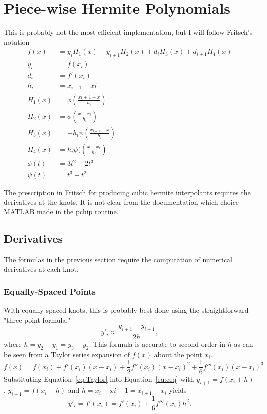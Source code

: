 \documentclass{scrartcl}
\begin{document}
\section{Piece-wise Hermite Polynomials}
This is probably not the most efficient implementation, but
I will follow Fritsch's notation\cite{Fritsch}
\begin{align}
f(x) &= y_i H_1(x) + y_{i+1} H_2(x) + d_i H_3(x) + d_{i+1} H_4(x)\\
y_i &= f(x_i)\\
d_i &= f'(x_i)\\
h_i &= x_{i+1}-x{i}\\
H_1(x) &= \phi\left(\frac{x{i+1}-x}{h_i}\right)\\
H_2(x) &= \phi\left(\frac{x-x_i}{h_i}\right)\\
H_3(x) &= -h_i\psi\left(\frac{x_{i+1}-x}{h_i}\right)\\
H_4(x) &= h_i\psi(\left(\frac{x-x_i}{h_i}\right)\\
\phi(t) &= 3t^2-2t^3\\
\psi(t) &= t^3-t^2
\end{align}

The prescription in Fritsch\cite{Fritsch} for producing cubic
hermite interpolants requires the derivatives at the knots. It
is not clear from the documentation which choice MATLAB
made in the pchip routine.
\subsection{Derivatives}
The formulas in the previous section require the computation of
numerical derivatives at each knot.
\subsubsection{Equally-Spaced Points}
With equally-spaced knots, this
is probably best done using the straightforward "three point formula."
\begin{equation}
y'_i \approx \frac{y_{i+1}-y_{i-1}}{2h},\label{eq:ceq}
\end{equation}
where $h=y_2-y_1=y_3-y_2$.
This formula is accurate to second order in $h$ as can be seen
from a Taylor series expansion of $f(x)$ about the point $x_i$.
\begin{equation}
f(x)=f(x_i)+f'(x_i)(x-x_i)+\frac{1}{2}f''(x_i)(x-x_i)^2+
	\frac{1}{6}f'''(x_i)(x-x_i)^3\label{eq:Taylor}
\end{equation}
Substituting Equation~\ref{eq:Taylor} into Equation~\ref{eq:ceq}
with $y_{i+1}=f(x_i+h)$, $y_{i-1}=f(x_i-h)$ and
$h=x_i-x{i-1}=x_{i+1}-x_i$ yields
\begin{equation}
y'_i=f'(x_i)=f'(x_i)+\frac{1}{6}f'''(x_i)h^2.
\end{equation}
\end{document}
